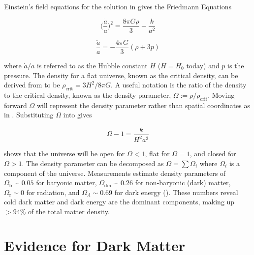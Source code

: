 Einstein's field equations for the solution in  gives the Friedmann Equations

\begin{equation}
\Big(\frac{\dot{a}}{a}\Big)^{2} = \frac{8\pi G \rho}{3} - \frac{k}{a^{2}}
\label{eq:friedman1}
\end{equation}

\begin{equation}
\frac{\ddot{a}}{a} = -\frac{4\pi G}{3}(\rho + 3p)
\label{eq:friedman2}
\end{equation}

\noindent where $\dot{a}/a$ is referred to as the Hubble
constant $H$ ($H = H_{0}$ today) and $p$ is the pressure.  The density for a flat universe, known as the critical density, can be derived
from  to be $\rho_{\mathrm{crit}} = 3H^2 / 8\pi G$.  A useful
notation is the ratio of the density to the critical density, known as the density parameter,
$\Omega := \rho/\rho_{\mathrm{crit}}$.  Moving forward $\Omega$ will represent the density
parameter rather than spatial coordinates as in .  Substituting
$\Omega$ into  gives

\begin{equation}
\Omega - 1 = \frac{k}{H^{2}{a^{2}}}
\label{eq:dark_matter_lambda_cdm_dens_par}
\end{equation}

 shows that the universe will be open for $\Omega < 1$, flat for $\Omega = 1$, and
closed for $\Omega > 1$.  The density parameter can be decomposed as $\Omega = \sum \Omega_{i}$ where $\Omega_{i}$ is a component of the
universe.  Measurements estimate density parameters of $\Omega_{\mathrm{b}} \sim 0.05$ for baryonic matter,
$\Omega_{\mathrm{dm}} \sim 0.26$ for non-baryonic (dark)
matter, $\Omega_{\mathrm{r}} \sim 0$
for radiation, and $\Omega_{\Lambda} \sim 0.69$ for dark energy ().  These numbers reveal cold dark matter and dark
energy are the dominant components, making up $> 94\%$ of the total matter density.



\section[Evidence for Dark Matter][Evidence for Dark Matter]{Evidence for Dark Matter}
\label{sec:dark_matter_evidence}
